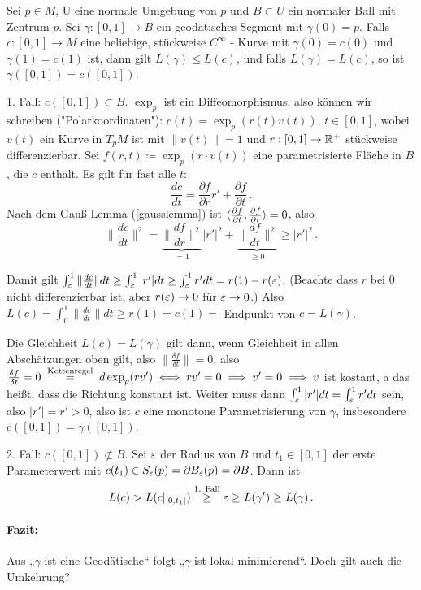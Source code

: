 \documentclass[a4paper,twoside,DIV15,BCOR12mm]{scrbook}
\renewcommand{\da}{\coloneqq}
\begin{document}
\begin{satz}
\label{geolokmin}
Sei $p \in M$, U eine normale Umgebung von $p$ und $B \subset U$ ein normaler Ball mit Zentrum $p$. Sei $\gamma: [0,1] \to B$ ein geodätisches Segment mit $\gamma(0)=p$. Falls $c:[0,1] \to M$ eine beliebige, stückweise $C^\infty$ - Kurve mit $\gamma(0)=c(0)$ und $\gamma(1)=c(1)$ ist, dann gilt $L(\gamma) \le L(c)$, und falls $L(\gamma)=L(c)$, so ist $\gamma([0,1]) = c([0,1])$.
\end{satz}
\begin{beweis}
1. Fall: $c([0,1]) \subset B$. $\exp_p$ ist ein Diffeomorphismus, also können wir schreiben ("Polarkoordinaten"):
$c(t)=\exp_p(r(t)v(t))$, $t \in [0,1]$, wobei $v(t)$ ein Kurve in $T_pM$  ist mit $\|v(t)\|=1$ und $r:[0,1] \to \mathbb{R}^+$ stückweise differenzierbar. Sei $f(r,t) \da \exp_p(r\cdot v(t))$ eine parametrisierte Fläche in $B$, die $c$ enthält. Es gilt für fast alle $t$: 
\[ \frac{dc}{dt}=\frac{\partial f}{\partial r}r' + \frac{\partial f}{\partial t}\,.
\]
Nach dem Gauß-Lemma (\ref{gausslemma}) ist $\langle\frac{\partial f}{\partial t},\frac{\partial f}{\partial r}\rangle = 0$, also 
\[
\|\frac{dc}{dt}\|^2 = \underbrace{\|\frac{df}{dr}\|^2}_{=1} |r'|^2 + \underbrace{\|\frac{df}{dt}\|^2}_{\ge 0} \ge |r'|^2\,.
\]

Damit gilt $\int_\varepsilon^1 \|\frac{dc}{dt}\| dt \ge \int_\varepsilon^1|r'|dt \ge \int_\varepsilon^1r'dt = r(1) - r(\varepsilon)$. (Beachte dass $r$ bei 0 nicht differenzierbar ist, aber $r(\varepsilon) \to 0$ für $\varepsilon \to 0$.) Also $L(c) = \int_0^1\|\frac{dc}{dt}\| dt \ge r(1) = c(1) = $ Endpunkt von $c = L(\gamma)$.

Die Gleichheit $L(c) = L(\gamma)$ gilt dann, wenn Gleichheit in allen Abschätzungen oben gilt, also $\|\frac{\delta f}{\delta t}\| = 0$, also $\frac{\delta f}{\delta t} = 0 \gleichnach{Kettenregel} d\exp_p(rv') \gdw rv'= 0\folgt v'=0 \folgt v$ ist kostant, a das heißt, dass die Richtung konstant ist. Weiter muss dann $\int_\varepsilon^1 |r'|dt = \int_\varepsilon^1 r' dt$ sein, also $|r'| = r' >0$, also ist $c$ eine monotone Parametrisierung von $\gamma$, insbesondere $c([0,1]) = \gamma([0,1])$.

2. Fall: $c([0,1]) \not\subset B$. Sei $\varepsilon$ der Radius von $B$ und $t_1\in [0,1]$ der erste Parameterwert mit $c(t_1) \in S_\varepsilon(p) = \partial B_\varepsilon (p) = \partial B$. Dann ist
\[
L(c) > L(c|_{[0,t_1]}) \stackrel{\text{1. Fall}}\ge \varepsilon \ge L(\gamma') \ge L(\gamma)\,.
\]
\end{beweis}

\paragraph{Fazit:} Aus „$\gamma$ ist eine Geodätische“ folgt „$\gamma$ ist lokal minimierend“. Doch gilt auch die Umkehrung?
\end{document}
